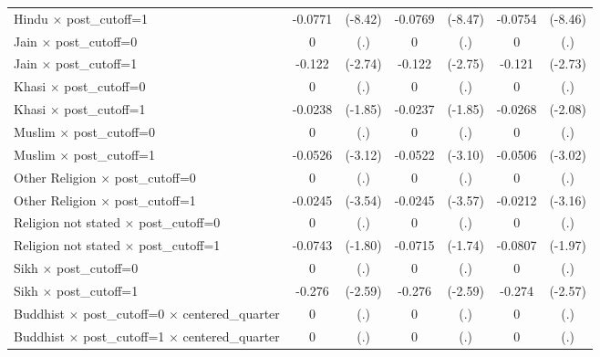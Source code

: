 {\begin{tabular}{l*{3}{cc}}
Hindu $\times$ post\_cutoff=1&     -0.0771\sym{***}&     (-8.42)&     -0.0769\sym{***}&     (-8.47)&     -0.0754\sym{***}&     (-8.46)\\
Jain $\times$ post\_cutoff=0&           0         &         (.)&           0         &         (.)&           0         &         (.)\\
Jain $\times$ post\_cutoff=1&      -0.122\sym{**} &     (-2.74)&      -0.122\sym{**} &     (-2.75)&      -0.121\sym{**} &     (-2.73)\\
Khasi $\times$ post\_cutoff=0&           0         &         (.)&           0         &         (.)&           0         &         (.)\\
Khasi $\times$ post\_cutoff=1&     -0.0238         &     (-1.85)&     -0.0237         &     (-1.85)&     -0.0268\sym{*}  &     (-2.08)\\
Muslim $\times$ post\_cutoff=0&           0         &         (.)&           0         &         (.)&           0         &         (.)\\
Muslim $\times$ post\_cutoff=1&     -0.0526\sym{**} &     (-3.12)&     -0.0522\sym{**} &     (-3.10)&     -0.0506\sym{**} &     (-3.02)\\
Other Religion $\times$ post\_cutoff=0&           0         &         (.)&           0         &         (.)&           0         &         (.)\\
Other Religion $\times$ post\_cutoff=1&     -0.0245\sym{***}&     (-3.54)&     -0.0245\sym{***}&     (-3.57)&     -0.0212\sym{**} &     (-3.16)\\
Religion not stated $\times$ post\_cutoff=0&           0         &         (.)&           0         &         (.)&           0         &         (.)\\
Religion not stated $\times$ post\_cutoff=1&     -0.0743         &     (-1.80)&     -0.0715         &     (-1.74)&     -0.0807\sym{*}  &     (-1.97)\\
Sikh $\times$ post\_cutoff=0&           0         &         (.)&           0         &         (.)&           0         &         (.)\\
Sikh $\times$ post\_cutoff=1&      -0.276\sym{**} &     (-2.59)&      -0.276\sym{**} &     (-2.59)&      -0.274\sym{*}  &     (-2.57)\\
Buddhist $\times$ post\_cutoff=0 $\times$ centered\_quarter&           0         &         (.)&           0         &         (.)&           0         &         (.)\\
Buddhist $\times$ post\_cutoff=1 $\times$ centered\_quarter&           0         &         (.)&           0         &         (.)&           0         &         (.)\\

\end{tabular}}
